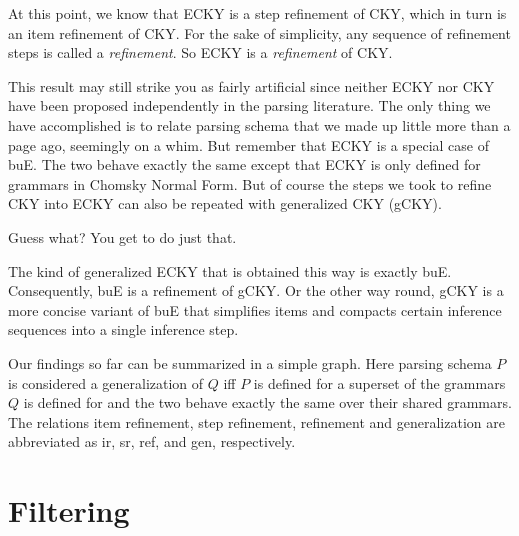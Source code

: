 At this point, we know that ECKY is a step refinement of CKY, which in turn is an item refinement of CKY\@.
For the sake of simplicity, any sequence of refinement steps is called a \emph{refinement}.
So ECKY is a \emph{refinement} of CKY\@.

This result may still strike you as fairly artificial since neither ECKY nor CKY have been proposed independently in the parsing literature.
The only thing we have accomplished is to relate parsing schema that we made up little more than a page ago, seemingly on a whim. 
But remember that ECKY is a special case of buE.
The two behave exactly the same except that ECKY is only defined for grammars in Chomsky Normal Form.
But of course the steps we took to refine CKY into ECKY can also be repeated with generalized CKY (gCKY).
%
\begin{exercise}
    Guess what? You get to do just that.
\end{exercise}

The kind of generalized ECKY that is obtained this way is exactly buE\@.
Consequently, buE is a refinement of gCKY\@.
Or the other way round, gCKY is a more concise variant of buE that simplifies items and compacts certain inference sequences into a single inference step.

Our findings so far can be summarized in a simple graph.
Here parsing schema $P$ is considered a generalization of $Q$ iff $P$ is defined for a superset of the grammars $Q$ is defined for and the two behave exactly the same over their shared grammars.
The relations item refinement, step refinement, refinement and generalization are abbreviated as ir, sr, ref, and gen, respectively.
%
\begin{center}
\end{center}

\section{Filtering}

